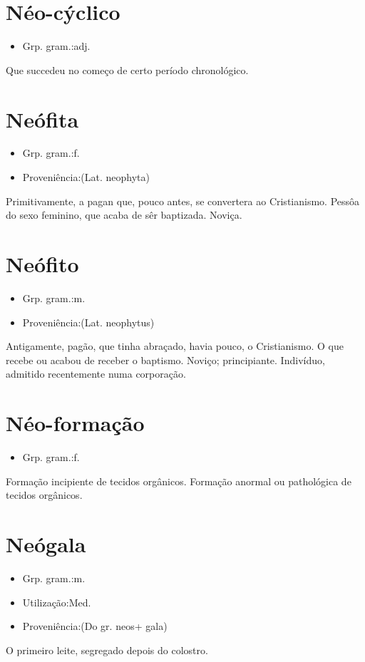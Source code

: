 \section{Néo-cýclico}
\begin{itemize}
\item {Grp. gram.:adj.}
\end{itemize}
Que succedeu no começo de certo período chronológico.
\section{Neófita}
\begin{itemize}
\item {Grp. gram.:f.}
\end{itemize}
\begin{itemize}
\item {Proveniência:(Lat. \textunderscore neophyta\textunderscore )}
\end{itemize}
Primitivamente, a pagan que, pouco antes, se convertera ao Cristianismo.
Pessôa do sexo feminino, que acaba de sêr baptizada.
Noviça.
\section{Neófito}
\begin{itemize}
\item {Grp. gram.:m.}
\end{itemize}
\begin{itemize}
\item {Proveniência:(Lat. \textunderscore neophytus\textunderscore )}
\end{itemize}
Antigamente, pagão, que tinha abraçado, havia pouco, o Cristianismo.
O que recebe ou acabou de receber o baptismo.
Noviço; principiante.
Indivíduo, admitido recentemente numa corporação.
\section{Néo-formação}
\begin{itemize}
\item {Grp. gram.:f.}
\end{itemize}
Formação incipiente de tecidos orgânicos.
Formação anormal ou pathológica de tecidos orgânicos.
\section{Neógala}
\begin{itemize}
\item {Grp. gram.:m.}
\end{itemize}
\begin{itemize}
\item {Utilização:Med.}
\end{itemize}
\begin{itemize}
\item {Proveniência:(Do gr. \textunderscore neos\textunderscore  + \textunderscore gala\textunderscore )}
\end{itemize}
O primeiro leite, segregado depois do colostro.
